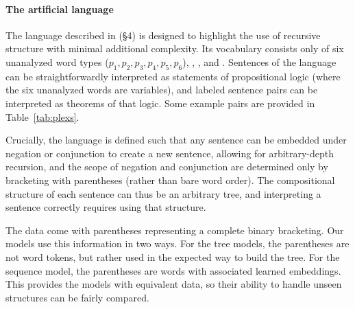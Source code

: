 \paragraph{The artificial language} The language described in  (\S4) is designed to highlight the use of recursive structure with minimal additional complexity. Its vocabulary consists only of six unanalyzed word types ($p_1, p_2, p_3, p_4, p_5, p_6$), , , and . Sentences of the language can be straightforwardly interpreted as statements of propositional logic (where the six unanalyzed words are variables), and labeled sentence pairs can be interpreted as theorems of that logic. Some example pairs are provided in Table~\ref{tab:plexs}.

Crucially, the language is defined such that any sentence can be embedded under negation or conjunction to create a new sentence, allowing for arbitrary-depth recursion, and the scope of negation and conjunction are determined only by bracketing with parentheses (rather than bare word order). The compositional structure of each sentence can thus be an arbitrary tree, and interpreting a sentence correctly requires using that structure.

The data come with parentheses representing a complete binary bracketing. Our models use this information in two ways. For the tree models, the parentheses are not word tokens, but rather used in the expected way to build the tree. For the sequence model, the parentheses are words with associated learned embeddings. This provides the models with equivalent data, so their ability to handle unseen structures can be fairly compared.

